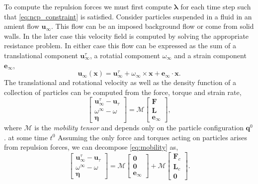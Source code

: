 \documentclass[preprint, 10pt]{elsarticle}
\begin{document}
To compute the repulsion forces we must first compute $\pmb{\lambda}$ for each time step such that \eqref{eq:ncp_constraint} is satisfied.
Consider particles suspended in a fluid in an amient flow $\mathbf{u}_\infty$. This flow can be an imposed background flow or come from solid walls. In the later case this velocity field is computed by solving the appropriate resistance problem. In either case this flow can be expressed as the sum of a translational component $\mathbf{u}_{\infty}^\tau$, a rotatial compoment $\omega_{\infty}$ and a strain component $\mathbf{e}_{\infty}$,
\[ \mathbf{u}_{\infty}(\mathbf{x}) =   \mathbf{u}_{\infty}^\tau + \omega_\infty\times \mathbf{x} + \mathbf{e}_\infty \cdot\mathbf{x}.\]
The translational and rotational velocity as well as the density function of a collection of particles can be computed from the force, torque and strain rate\cite{Karrila1991},
\begin{equation}\label{eq:mobility} \begin{bmatrix} \mathbf{u}_\infty^\tau - \mathbf{u}_\tau\\ \omega^\infty - \omega \\\pmb{\eta}\end{bmatrix} = \mathcal{M}\begin{bmatrix}\mathbf{F}\\\mathbf{L}\\\mathbf{e}_\infty\end{bmatrix},\end{equation}
where $\mathcal{M}$ is the \textit{mobility tensor} and depends only on the particle configuration $\mathbf{q}^0$. at some time $t^0$ Assuming the only force and torques acting on particles arises from repulsion forces, we can decompose \eqref{eq:mobility} as,
\[ \begin{bmatrix} \mathbf{u}_\infty^\tau - \mathbf{u}_\tau\\ \omega^\infty - \omega \\\pmb{\eta}\end{bmatrix} = \mathcal{M}\begin{bmatrix}\mathbf{0}\\\mathbf{0}\\\mathbf{e}_\infty\end{bmatrix} + \mathcal{M}\begin{bmatrix}\mathbf{F}_c\\\mathbf{L}_c\\\mathbf{0}\end{bmatrix}.\]
\end{document}
